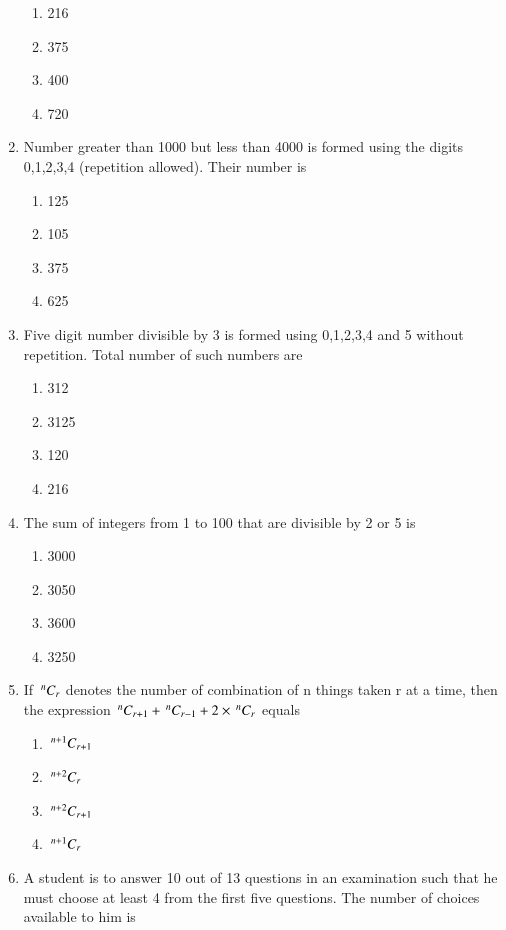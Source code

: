 \begin{enumerate}[label=\arabic*.,ref=\thesubsection.\theenumi]
\begin{enumerate}
\item 216
\item 375
\item 400
\item 720
\end{enumerate}
\item Number greater than 1000 but less than 4000 is formed using the digits 0,1,2,3,4 (repetition allowed). Their number is 
\begin{enumerate}
\item 125
\item 105 
\item 375
\item 625\\
\end{enumerate}
\item Five digit number divisible by 3 is formed using 0,1,2,3,4 and 5 without repetition. Total number of such numbers are
\begin{enumerate}
\item 312
\item 3125 
\item 120
\item 216\\
\end{enumerate}
\item The sum of integers from 1 to 100 that are divisible by 2 or 5 is
\begin{enumerate}
\item 3000
\item 3050
\item 3600
\item 3250\\
\end{enumerate}
\item If $\,^{n}C_{r}$ denotes the number of combination of n things taken r at a time, then the expression $\,^{n}C_{r+1}+\,^{n}C_{r-1}+2 \times \,^{n}C_{r}$ equals
\begin{enumerate}
\item $\,^{n+1}C_{r+1}$
\item $\,^{n+2}C_{r}$
\item $\,^{n+2}C_{r+1}$
\item $\,^{n+1}C_{r}$\\
\end{enumerate}
\item A student is to answer 10 out of 13 questions in an examination such that he must choose at least 4 from the first five questions. The number of choices available to him is
\begin{enumerate}

\end{enumerate}
\end{enumerate}
